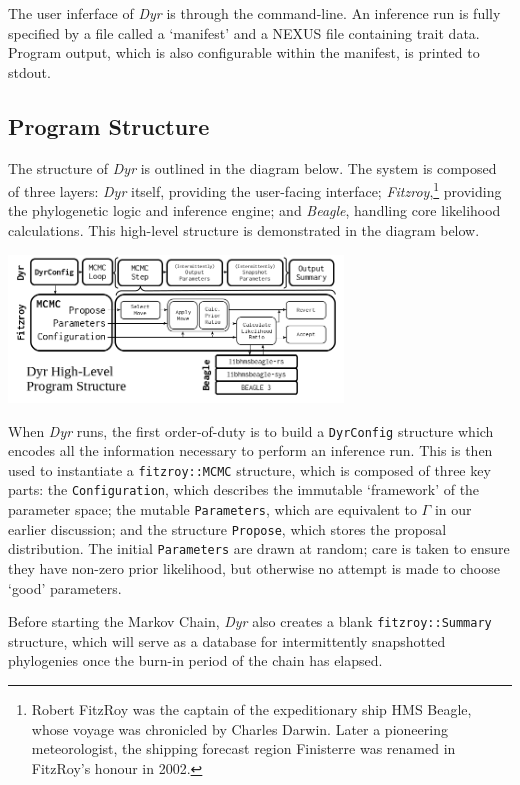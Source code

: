 \documentclass[10pt,journal,compsoc]{IEEEtran}
\begin{document}
The user inferface of \textit{Dyr} is through the command-line. An inference run is fully specified by a file called a `manifest' and a NEXUS file containing trait data. Program output, which is also configurable within the manifest, is printed to stdout.

\subsection{Program Structure}

The structure of \textit{Dyr} is outlined in the diagram below. The system is composed of three layers: \textit{Dyr} itself, providing the user-facing interface; \textit{Fitzroy},\footnote{Robert FitzRoy was the captain of the expeditionary ship HMS Beagle, whose voyage was chronicled by Charles Darwin. Later a pioneering meteorologist, the shipping forecast region Finisterre was renamed in FitzRoy's honour in 2002.} providing the phylogenetic logic and inference engine; and \textit{Beagle}, handling core likelihood calculations. This high-level structure is demonstrated in the diagram below.

\vspace{0.4cm}
\includegraphics[width=8.9cm]{progdiagram}
\vspace{0.4cm}

When \textit{Dyr} runs, the first order-of-duty is to build a \texttt{DyrConfig} structure which encodes all the information necessary to perform an inference run. This is then used to instantiate a \texttt{fitzroy::MCMC} structure, which is composed of three key parts: the \texttt{Configuration}, which describes the immutable `framework' of the parameter space; the mutable \texttt{Parameters}, which are equivalent to $\Gamma$ in our earlier discussion; and the structure \texttt{Propose}, which stores the proposal distribution. The initial \texttt{Parameters} are drawn at random; care is taken to ensure they have non-zero prior likelihood, but otherwise no attempt is made to choose `good' parameters.

Before starting the Markov Chain, \textit{Dyr} also creates a blank \texttt{fitzroy::Summary} structure, which will serve as a database for intermittently snapshotted phylogenies once the burn-in period of the chain has elapsed. 
\end{document}
